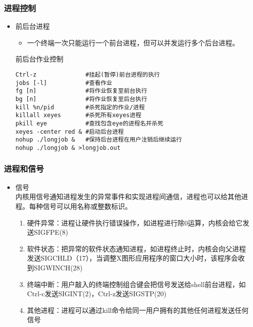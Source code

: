 \documentclass[xcolor=svgnames,presentation]{beamer}
\begin{document}
\begin{frame}[fragile]
\frametitle{进程控制}
\label{sec-3-1-3}
\begin{itemize}

\item 前后台进程
\label{sec-3-1-3-1}%
\begin{itemize}

\item 一个终端一次只能运行一个前台进程，但可以并发运行多个后台进程。
\label{sec-3-1-3-1-1}%
\end{itemize} %
\begin{exampleblock}{前后台作业控制}
\label{sec-3-1-3-1-2}


\begin{verbatim}
Ctrl-z              #挂起(暂停)前台进程的执行
jobs [-l]           #查看作业
fg [n]              #将作业恢复至前台执行
bg [n]              #将作业恢复至后台执行
kill %n/pid         #杀死指定的作业/进程
killall xeyes       #杀死所有xeyes进程
pkill eye           #查找包含eye的进程名并杀死
xeyes -center red & #启动后台进程
nohup ./longjob &   #保持后台进程在用户注销后继续运行
nohup ./longjob & >longjob.out
\end{verbatim}
\end{exampleblock}
\end{itemize} %
\end{frame}
\begin{frame}
\frametitle{进程和信号}
\label{sec-3-1-4}
\begin{itemize}

\item 信号\\
\label{sec-3-1-4-1}%
内核用信号通知进程发生的异常事件和实现进程间通信，进程也可以给其他进程。每种信号可以用名称或整数标识。
\begin{enumerate}
\item 硬件异常：进程让硬件执行错误操作，如进程进行除0运算，内核会给它发送SIGFPE(8)
\item 软件状态：把异常的软件状态通知进程，如进程终止时，内核会向父进程发送SIGCHLD（17），当调整X图形应用程序的窗口大小时，该程序会收到SIGWINCH(28)
\item 终端中断：用户敲入的终端控制组合键会把信号发送给shell前台进程，如Ctrl-c发送SIGINT(2)，Ctrl-z发送SIGSTP(20)
\item 其他进程：进程可以通过kill命令给同一用户拥有的其他任何进程发送任何信号
\end{enumerate}
\end{itemize} %
\end{frame}
\end{document}
